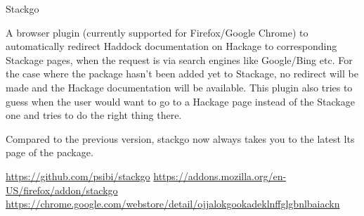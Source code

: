 \begin{hcarentry}[new]{Stackgo}
\makeheader

A browser plugin (currently supported for Firefox/Google Chrome) to
automatically redirect Haddock documentation on Hackage to
corresponding Stackage pages, when the request is via search engines
like Google/Bing etc. For the case where the package hasn't been added
yet to Stackage, no redirect will be made and the Hackage
documentation will be available. This plugin also tries to guess when
the user would want to go to a Hackage page instead of the Stackage
one and tries to do the right thing there.

Compared to the previous version, stackgo now always takes you to the
latest lts page of the package.

\FurtherReading
\url{https://github.com/psibi/stackgo}
\url{https://addons.mozilla.org/en-US/firefox/addon/stackgo}
\url{https://chrome.google.com/webstore/detail/ojjalokgookadeklnffglgbnlbaiackn}
\end{hcarentry}
